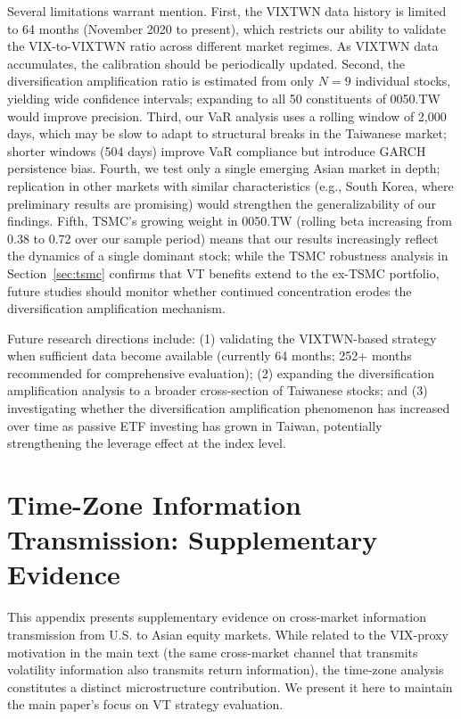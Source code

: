 Several limitations warrant mention. First, the VIXTWN data history is limited to 64 months (November 2020 to present), which restricts our ability to validate the VIX-to-VIXTWN ratio across different market regimes. As VIXTWN data accumulates, the calibration should be periodically updated. Second, the diversification amplification ratio is estimated from only $N = 9$ individual stocks, yielding wide confidence intervals; expanding to all 50 constituents of 0050.TW would improve precision. Third, our VaR analysis uses a rolling window of 2,000 days, which may be slow to adapt to structural breaks in the Taiwanese market; shorter windows (504 days) improve VaR compliance but introduce GARCH persistence bias. Fourth, we test only a single emerging Asian market in depth; replication in other markets with similar characteristics (e.g., South Korea, where preliminary results are promising) would strengthen the generalizability of our findings. Fifth, TSMC's growing weight in 0050.TW (rolling beta increasing from 0.38 to 0.72 over our sample period) means that our results increasingly reflect the dynamics of a single dominant stock; while the TSMC robustness analysis in Section~\ref{sec:tsmc} confirms that VT benefits extend to the ex-TSMC portfolio, future studies should monitor whether continued concentration erodes the diversification amplification mechanism.

Future research directions include: (1) validating the VIXTWN-based strategy when sufficient data become available (currently 64 months; 252+ months recommended for comprehensive evaluation); (2) expanding the diversification amplification analysis to a broader cross-section of Taiwanese stocks; and (3) investigating whether the diversification amplification phenomenon has increased over time as passive ETF investing has grown in Taiwan, potentially strengthening the leverage effect at the index level.



\appendix

\section{Time-Zone Information Transmission: Supplementary Evidence}
\label{app:tz}

This appendix presents supplementary evidence on cross-market information transmission from U.S. to Asian equity markets. While related to the VIX-proxy motivation in the main text (the same cross-market channel that transmits volatility information also transmits return information), the time-zone analysis constitutes a distinct microstructure contribution. We present it here to maintain the main paper's focus on VT strategy evaluation.

